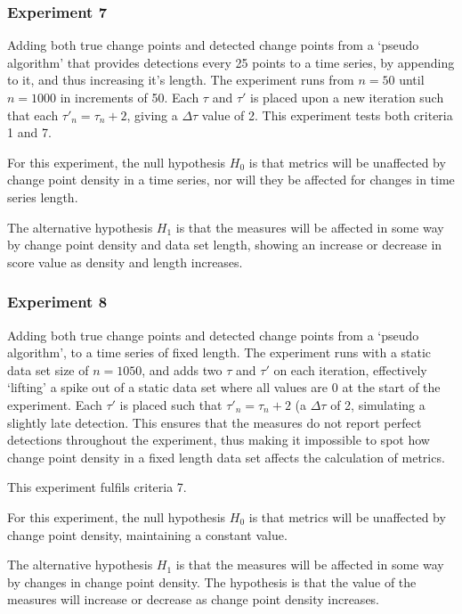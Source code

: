 \documentclass{uvamscse}	%
\begin{document}
\subsubsection{Experiment 7}

Adding both true change points and detected change points from a `pseudo algorithm' that provides detections every 25 points to a time series, by appending to it, and thus increasing it's length. The experiment runs from $n=50$ until $n=1000$ in increments of 50. Each $\tau$ and $\tau'$ is placed upon a new iteration such that each $\tau'_n = \tau_n + 2$, giving a $\Delta \tau$ value of 2. This experiment tests both criteria 1 and 7.

For this experiment, the null hypothesis $H_0$ is that metrics will be unaffected by change point density in a time series, nor will they be affected for changes in time series length.

The alternative hypothesis $H_1$ is that the measures will be affected in some way by change point density and data set length, showing an increase or decrease in score value as density and length increases.

\subsubsection{Experiment 8}

Adding both true change points and detected change points from a `pseudo algorithm', to a time series of fixed length. The experiment runs with a static data set size of $n=1050$, and adds two $\tau$ and $\tau'$ on each iteration, effectively `lifting' a spike out of a static data set where all values are 0 at the start of the experiment. Each $\tau'$ is placed such that $\tau'_n = \tau_n + 2$ (a $\Delta \tau$ of 2, simulating a slightly late detection. This ensures that the measures do not report perfect detections throughout the experiment, thus making it impossible to spot how change point density in a fixed length data set affects the calculation of metrics.

This experiment fulfils criteria 7.

For this experiment, the null hypothesis $H_0$ is that metrics will be unaffected by change point density, maintaining a constant value.

The alternative hypothesis $H_1$ is that the measures will be affected in some way by changes in change point density. The hypothesis is that the value of the measures will increase or decrease as change point density increases.
\end{document}
